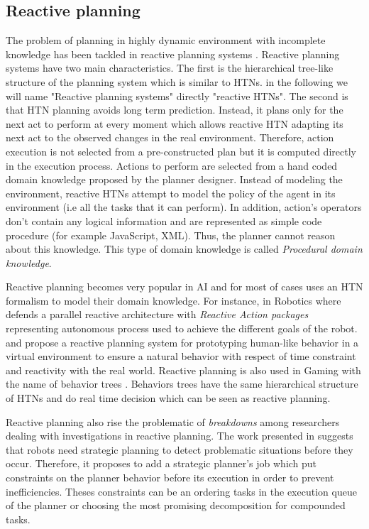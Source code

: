 \documentclass[conference]{IEEEtran}
\begin{document}
	\subsection{Reactive planning}
	
	\par The problem of planning in highly dynamic environment with incomplete knowledge has been tackled in reactive planning systems \cite{schoppers1987universal}. 
	Reactive planning systems have two main characteristics. The first is the hierarchical tree-like structure of the planning system which is similar to HTNs. in the following we will name  "Reactive planning systems" directly "reactive HTNs".
	The second is that HTN planning avoids long term prediction. Instead, it plans only for the next act to perform at every moment which allows reactive HTN adapting its next act to the observed changes in the real environment. Therefore, action execution is not selected from a pre-constructed plan but it is computed directly in the execution process.
	Actions to perform are selected from a hand coded domain knowledge proposed by the planner designer. Instead of modeling the environment, reactive HTNs attempt to model the policy of the agent in its environment (i.e all the tasks that it can perform). In addition, action's operators don't contain any logical information and are represented as simple code procedure (for example JavaScript, XML). Thus, the planner cannot reason about this knowledge. This type of domain knowledge is called \emph{Procedural domain knowledge}.
	\par Reactive planning becomes very popular in AI and for most of cases uses an HTN formalism to model their domain knowledge. For instance, in Robotics where \cite{firby1987investigation} defends a parallel reactive architecture with \emph{Reactive Action packages} representing autonomous process used to achieve the different goals of the robot. \cite{bryson2001intelligence} and \cite{brom2005hierarchical} propose a reactive planning system for prototyping human-like behavior in a virtual environment to ensure a natural behavior with respect of time constraint and reactivity with the real world. Reactive planning is also used in Gaming with the name of  behavior trees \cite{isla2005handling}. Behaviors trees have the same hierarchical structure of HTNs and do real time decision which can be seen as reactive planning. 
	
	
	\par Reactive planning also rise the problematic  of \emph{breakdowns} among researchers dealing with investigations in reactive planning. The work presented in  \cite{firby1987investigation} suggests that robots need strategic planning to detect problematic situations before they occur. Therefore, it proposes to add a strategic planner's job which put constraints on the planner behavior before its execution in order to prevent inefficiencies. Theses constraints can be an ordering tasks in the execution queue of the planner or choosing the most promising decomposition for compounded tasks.
	
\end{document}
